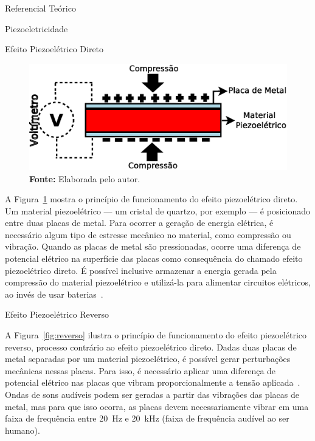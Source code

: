 \begin{chapter}{Referencial Teórico}
\begin{section}{Piezoeletricidade}
\begin{subsection}{Efeito Piezoelétrico Direto}
\begin{figure}[!h]
	\centering
	\begin{minipage}[c]{\textwidth}
	\centering
	\includegraphics[width=0.8\linewidth]{fig/EfeitoPiezoEletricoDireto}
	\caption{Efeito piezoelétrico direto.}
	\vspace{-1cm}
	\caption*{\textbf{Fonte: }Elaborada pelo autor.}
	\label{fig:direto}
	\end{minipage}
\end{figure}

\vspace{-0.5cm}
A Figura~\ref{fig:direto} mostra o princípio de funcionamento do efeito
piezoelétrico direto. Um material piezoelétrico --- um cristal de quartzo, por
exemplo --- é posicionado entre duas placas de metal. Para ocorrer a geração de
energia elétrica, é necessário algum tipo de estresse mecânico no material, como
compressão ou vibração. Quando as placas de metal são pressionadas, ocorre uma
diferença de potencial elétrico na superfície das placas como consequência do
chamado efeito piezoelétrico direto.  É possível inclusive armazenar a
energia gerada pela compressão do material piezoelétrico e utilizá-la para
alimentar circuitos elétricos, ao invés de usar baterias~\cite{twitter}. 

\end{subsection}


\begin{subsection}{Efeito Piezoelétrico Reverso}

A Figura~\ref{fig:reverso} ilustra o princípio de funcionamento do efeito
piezoelétrico reverso, processo contrário ao efeito piezoelétrico direto. Dadas
duas placas de metal separadas por um material piezoelétrico, é possível gerar
perturbações mecânicas nessas placas. Para isso, é necessário aplicar uma
diferença de potencial elétrico nas placas que vibram proporcionalmente a tensão
aplicada~\cite{Lin12}. Ondas de sons audíveis podem ser geradas a partir das
vibrações das placas de metal, mas para que isso ocorra, as placas devem
necessariamente vibrar em uma faixa de frequência entre 20~Hz e 20~kHz (faixa de
frequência audível ao ser humano).



\end{subsection}
\end{section}
\end{chapter}
